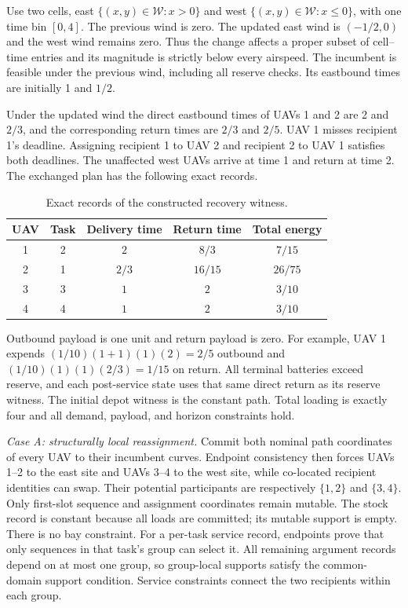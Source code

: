 Use two cells, east $\{(x,y)\in\mathcal W:x>0\}$ and west
$\{(x,y)\in\mathcal W:x\le0\}$, with one time bin $[0,4]$.
The previous wind is zero. The updated east wind is $(-1/2,0)$ and the
west wind remains zero. Thus the change affects a proper subset of
cell--time entries and its magnitude is strictly below every airspeed.
The incumbent is feasible under the previous wind, including all reserve
checks. Its eastbound times are initially 1 and $1/2$.

Under the updated wind the direct eastbound times of UAVs 1 and 2 are
2 and $2/3$, and the corresponding return times are $2/3$ and $2/5$.
UAV 1 misses recipient 1's deadline. Assigning recipient 1 to UAV 2 and
recipient 2 to UAV 1 satisfies both deadlines. The unaffected west UAVs
arrive at time 1 and return at time 2.
The exchanged plan has the following exact records.

\begin{table}[t]
\centering
\caption{Exact records of the constructed recovery witness.}
\label{tab:worked_recovery}
\begin{tabular}{ccccc}
\toprule
UAV & Task & Delivery time & Return time & Total energy\\
\midrule
1 & 2 & $2$ & $8/3$ & $7/15$\\
2 & 1 & $2/3$ & $16/15$ & $26/75$\\
3 & 3 & $1$ & $2$ & $3/10$\\
4 & 4 & $1$ & $2$ & $3/10$\\
\bottomrule
\end{tabular}
\end{table}

Outbound payload is one unit and return payload is zero. For example,
UAV 1 expends $(1/10)(1+1)(1)(2)=2/5$ outbound and
$(1/10)(1)(1)(2/3)=1/15$ on return. All terminal batteries exceed reserve,
and each post-service state uses that same direct return as its reserve
witness. The initial depot witness is the constant path. Total loading
is exactly four and all demand, payload, and horizon constraints hold.

\emph{Case A: structurally local reassignment.}
Commit both nominal path coordinates of every UAV to their incumbent
curves. Endpoint consistency then forces UAVs 1--2 to the east site and
UAVs 3--4 to the west site, while co-located recipient identities can swap.
Their potential participants are respectively $\{1,2\}$ and $\{3,4\}$.
Only first-slot sequence and assignment coordinates remain mutable.
The stock record is constant because all loads are committed; its mutable
support is empty. There is no bay constraint. For a per-task service
record, endpoints prove that only sequences in that task's group can
select it. All remaining argument records depend on at most one group,
so group-local supports satisfy the common-domain support condition.
Service constraints connect the two recipients within each group.

